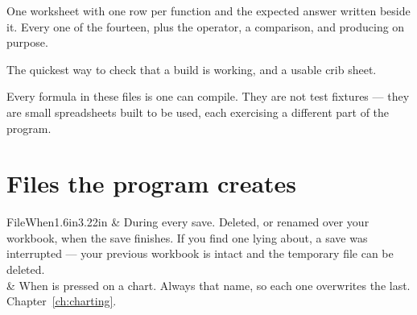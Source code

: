 
One worksheet with one row per function and the expected answer written beside
it. Every one of the fourteen, plus the \lit{\^{}} operator, a comparison, and
 producing  on purpose.

The quickest way to check that a build is working, and a usable crib sheet.

\begin{ccnote}
Every formula in these files is one \ccprod{} can compile. They are not test
fixtures --- they are small spreadsheets built to be used, each exercising a
different part of the program.
\end{ccnote}

\section{Files the program creates}

\begin{cctable}{File}{When}{1.6in}{3.22in}
 & During every save. Deleted, or renamed over your
workbook, when the save finishes. If you find one lying about, a save was
interrupted --- your previous workbook is intact and the temporary file can be
deleted. \\
 & When  is pressed on a chart. Always that name, so
each one overwrites the last. Chapter~\ref{ch:charting}. \\
\end{cctable}
